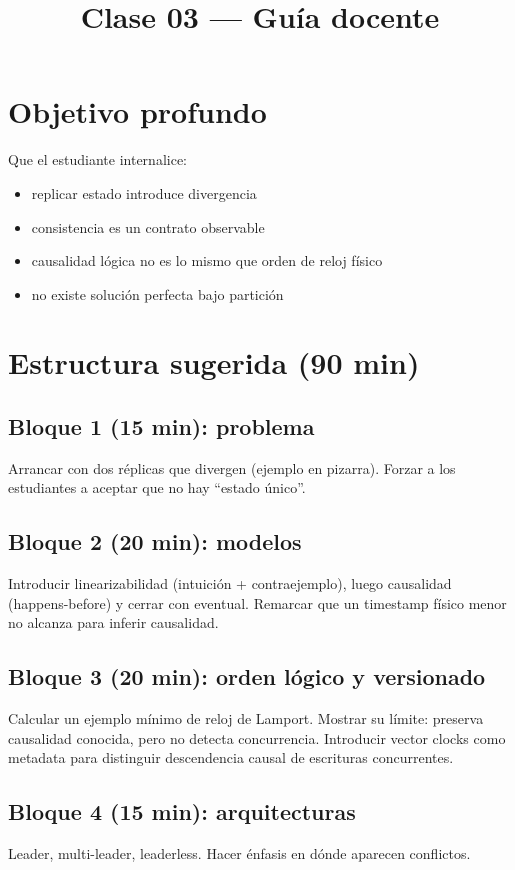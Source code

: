 \documentclass[variant=docente,cover=institutional,mode=screen]{ua-engineering-v6-article}
\title{Clase 03 --- Guía docente}
\author{\UAProfessor}
\date{\UADate}
\begin{document}
\maketitle

\section{Objetivo profundo}

Que el estudiante internalice:
\begin{itemize}
\item replicar estado introduce divergencia
\item consistencia es un contrato observable
\item causalidad lógica no es lo mismo que orden de reloj físico
\item no existe solución perfecta bajo partición
\end{itemize}

\section{Estructura sugerida (90 min)}

\subsection*{Bloque 1 (15 min): problema}
Arrancar con dos réplicas que divergen (ejemplo en pizarra). Forzar a los estudiantes a aceptar que no hay “estado único”.

\subsection*{Bloque 2 (20 min): modelos}
Introducir linearizabilidad (intuición + contraejemplo), luego causalidad (happens-before) y cerrar con eventual. Remarcar que un timestamp físico menor no alcanza para inferir causalidad.

\subsection*{Bloque 3 (20 min): orden lógico y versionado}
Calcular un ejemplo mínimo de reloj de Lamport. Mostrar su límite: preserva causalidad conocida, pero no detecta concurrencia. Introducir vector clocks como metadata para distinguir descendencia causal de escrituras concurrentes.

\subsection*{Bloque 4 (15 min): arquitecturas}
Leader, multi-leader, leaderless. Hacer énfasis en dónde aparecen conflictos.
\end{document}

